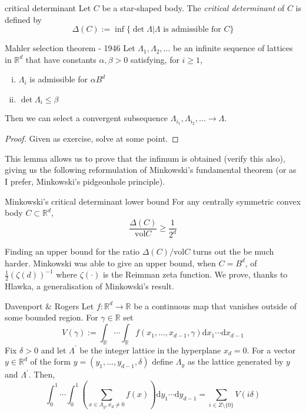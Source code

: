 \documentclass{article}
\begin{document}
\begin{definition}[]{critical determinant}
    Let $C$ be a star-shaped body. The {\it critical determinant} of $C$ is defined by 
    \[\Delta(C) := \inf \{\det \Lambda | \Lambda \text{ is admissible for } C\}\]
\end{definition}

\begin{lemma}[]{Mahler selection theorem - 1946}
    Let $\Lambda_1, \Lambda_2, \dots$ be an infinite sequence of lattices in $\mathbb{R}^d$ that have constants 
    $\alpha, \beta > 0$ satisfying, for $i \geq 1$, 
    \begin{enumerate}[(i)]
        \item $\Lambda_i$ is admissible for $\alpha B^d$
        \item $\det \Lambda_i \leq \beta$
    \end{enumerate}
    Then we can select a convergent subsequence $\Lambda_{i_1}, \Lambda_{i_2}, \dots \to \Lambda$.
\end{lemma}

\begin{proof}
    Given as exercise, solve at some point.
\end{proof}

This lemma allows us to prove that the infimum is obtained (verify this also), giving us the following reformulation
of Minkowski's fundamental theorem (or as I prefer, Minkowski's pidgeonhole principle).

\begin{theorem}[]{Minkowski's critical determinant lower bound}
    For any centrally symmetric convex body $C \subset \mathbb{R}^d$, 
    \[\frac{\Delta(C)}{\text{vol}C} \geq \frac{1}{2^d}\]
\end{theorem}

Finding an upper bound for the ratio $\Delta(C)/\text{vol}C$ turns out the be much harder. Minkowski was able to 
give an upper bound, when $C = B^d$, of $\frac{1}{2}(\zeta(d))^{-1}$ where $\zeta(\cdot)$ is the Reimman zeta function.
We prove, thanks to Hlawka, a generalisation of Minkowski's result. 

\begin{lemma}[]{Davenport $\&$ Rogers}
    Let $f:\mathbb{R}^d \to \mathbb{R}$ be a continuous map that vanishes outside of some bounded region. For $\gamma
    \in \mathbb{R}$ set \[V(\gamma) := \int_{\mathbb{R}}\cdots\int_{\mathbb{R}}f(x_1, \dots, x_{d-1}, \gamma)\mathrm{d}x_1 \cdots \mathrm{d}x_{d-1}\] 
    Fix $\delta > 0$ and let $\Lambda^\prime$ be the integer lattice in the hyperplane $x_d = 0$. For a vector $y \in \mathbb{R}^d$ 
    of the form $y = (y_1, \dots, y_{d-1}, \delta)$ define $\Lambda_y$ as the lattice generated by $y$ and $\Lambda^\prime$. 
    Then, \[\int_{0}^1 \cdots \int_{0}^1 \left(\sum_{x \in \Lambda_y, x_d \neq 0}f(x)\right)\mathrm{d}y_1 \cdots \mathrm{d}y_{d-1} 
    = \sum_{i \in Z\setminus \{0\}}V(i \delta)\]
\end{lemma}
\end{document}
